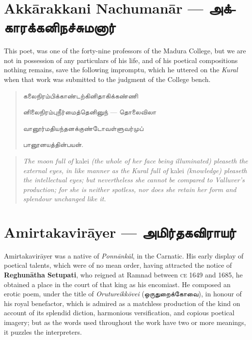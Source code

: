 \documentclass{article}
\newcommand{\TamilText}[1]{\texttamil{#1}}
\newcommand{\TamilBold}[1]{\texttamil{\textbf{#1}}}
\newcommand{\tam}[1]{\TamilText{#1}}
\newcommand{\tambold}[1]{\TamilBold{#1}}
\begin{document}
\section{Akk\={a}rakkani Nachuman\={a}r --- \tambold{அக்காரக்கனிநச்சுமனார்}}
\paragraph{}
This poet, was one of the forty-nine professors of the Madura College, but we are not in possession of any particulars of his life, and of his poetical compositions nothing remains, save the following impromptu, which he uttered on the \emph{Kural} when that work was submitted to the judgment of the College bench.
\begin{quotation}\small
\tam{கலைநிரம்பிக்காண்டற்கினிதாகிக்கண்ணி}

\tam{னிலைநிரம்புநீர்மைத்தெனினுந்} --- \tam{தொலைவிலா}

\tam{வானூர்மதியந்தனக்குண்டோவள்ளுவர்முப்‌}

\tam{பானூனயத்தின்பயன்‌}.
\end{quotation}
\begin{quotation}\small
\emph{The moon full of} kalei \emph{(the whole of her face being illuminated) pleaseth the external eyes, in like manner as the Kural full of} kalei \emph{(knowledge) pleaseth the intellectual eyes; but nevertheless she cannot be compared to Valluver's production; for she is neither spotless, nor does she retain her form and splendour unchanged like it.}
\end{quotation}
\section{Amirtakavir\={a}yer --- \tambold{அமிர்தகவிராயர்}}
\paragraph{}
Amirtakavir\={a}yer was a native of \emph{Ponn\={a}nk\={a}l}, in the Carnatic. His early display of poetical talents, which were of no mean order, having attracted the notice of \textbf{Reghun\={a}tha Setupati}, who reigned at Ramnad between \textsc{ce} 1649 and 1685, he obtained a place in the court of that king as his encomiast. He composed an erotic poem, under the title of \emph{Orutureikk\={o}vei} (\tam{ஒருதுறைக்கோவை}), in honour of his royal benefactor, which is admired as a matchless production of the kind on account of its splendid diction, harmonious versification, and copious poetical imagery; but as the words used throughout the work have two or more meanings, it puzzles the interpreters.
\end{document}
